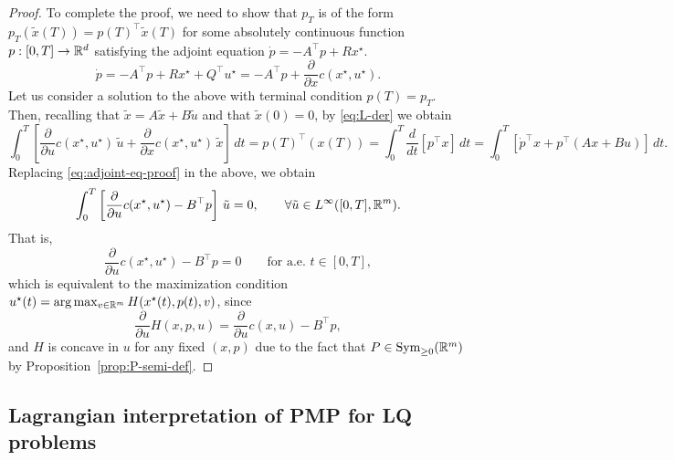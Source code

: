 \begin{proof}
    To complete the proof, we need to show that $p_T$ is of the form $p_T(\tilde x(T)) = p(T)^\top \tilde x(T)$ for some absolutely continuous function $p:[0,T]\to \mathbb{R}^d$ satisfying the adjoint equation $\dot p = -A^\top p + Rx^\star$.
    \begin{equation}
        \label{eq:adjoint-eq-proof}
        \dot p =-A^\top p + Rx^\star + Q^\top u^\star =  -A^\top p + \frac{\partial}{\partial x}c(x^\star, u^\star).
    \end{equation}
    Let us consider a solution to the above with terminal condition $p(T)=p_T$.
    Then, recalling that $\tilde x = A\tilde x + B \tilde u$ and that $\tilde x(0)=0$, by \eqref{eq:L-der} we obtain
    \begin{equation}
       \int_0^T \left[ \frac{\partial}{\partial u} c(x^\star, u^\star) \, \tilde u + \frac{\partial}{\partial x}c(x^\star, u^\star) \, \tilde x  \right] \, dt 
       = p(T)^\top (x(T)) 
       = \int_0^T \frac{d}{dt} \left[p^\top x\right]\, dt 
       = \int_0^T \left[ \dot p^\top x + p^\top (Ax + Bu) \right]\, dt.
    \end{equation}
    Replacing \eqref{eq:adjoint-eq-proof} in the above, we obtain 
    \begin{equation}
        \int_0^T \left[\frac{\partial}{\partial u} c(x^\star, u^\star) - B^\top p \right]\, \tilde u = 0, \qquad \forall \tilde u\in L^\infty([0,T],\mathbb{R}^m). 
    \end{equation} 
    That is, 
    \begin{equation}
       \frac{\partial}{\partial u} c(x^\star, u^\star) - B^\top p = 0 \qquad \text{for a.e.\ } t\in [0,T],  
    \end{equation}
    which is equivalent to the maximization condition $u^\star(t) = \arg\max_{v\in \mathbb{R}^m} H(x^\star(t),p(t),v)$, since
    \begin{equation}
        \frac{\partial}{\partial u} H(x,p,u) = \frac{\partial}{\partial u} c(x,u) - B^\top p,
    \end{equation}
    and $H$ is concave in $u$ for any fixed $(x,p)$ due to the fact that $P\in \operatorname{Sym}_{\ge0}(\mathbb{R}^m)$ by Proposition~\ref{prop:P-semi-def}.
\end{proof}

\subsection{Lagrangian interpretation of PMP for LQ problems}

